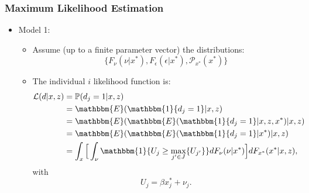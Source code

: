 \documentclass[10pt,letterpaper]{beamer}
\begin{document}
\begin{frame}
\frametitle{Maximum Likelihood Estimation}

\begin{itemize}
	\item Model 1:
	\begin{itemize}
		\item Assume (up to a finite parameter vector) the distributions: 
		\begin{equation*}
		\{F_{\nu}(\nu|x^{*}), F_{\epsilon}(\epsilon|x^{*}), \mathcal{P}_{x^{*}}(x^{*})\}
		\end{equation*}
		\item The individual $i$ likelihood function is:
		\begin{equation*}
		\begin{split}
		\mathcal{L}(d|x,z)&=\mathbb{P}(d_{j}=1|x,z)\\
		&=\mathbbm{E}(\mathbbm{1}\{d_{j}=1\}|x,z)\\
		&=\mathbbm{E}(\mathbbm{E}(\mathbbm{1}\{d_{j}=1\}|x,z,x^{*})|x,z)\\
		&=\mathbbm{E}(\mathbbm{E}(\mathbbm{1}\{d_{j}=1\}|x^{*})|x,z)\\
		&=\int_{x}\Big[\int_{\nu}\mathbbm{1}\{U_{j}\geq\max_{j'\in J}\{U_{j'}\}\}dF_{\nu}(\nu|x^{*})\Big]dF_{x^{*}}(x^{*}|x,z),\\
		\end{split}
		\end{equation*}
		with
		\begin{equation*}
		U_{j}=\beta x^{*}_{j}+\nu_{j}.
		\end{equation*}
	\end{itemize}
\end{itemize}
\end{frame}
\end{document}
